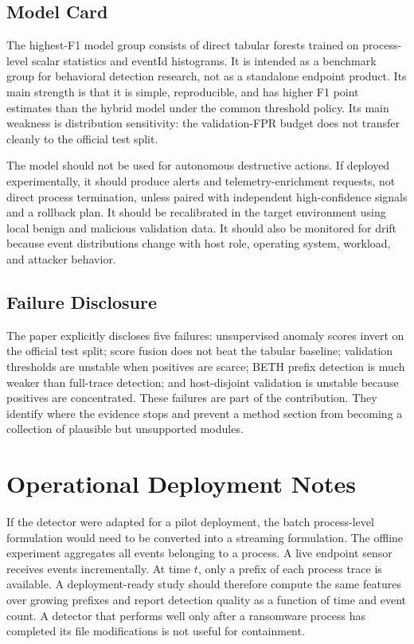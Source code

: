 \documentclass[journal]{IEEEtran}
\begin{document}
\subsection{Model Card}

The highest-F1 model group consists of direct tabular forests trained on process-level scalar statistics and eventId histograms. It is intended as a benchmark group for behavioral detection research, not as a standalone endpoint product. Its main strength is that it is simple, reproducible, and has higher F1 point estimates than the hybrid model under the common threshold policy. Its main weakness is distribution sensitivity: the validation-FPR budget does not transfer cleanly to the official test split.

The model should not be used for autonomous destructive actions. If deployed experimentally, it should produce alerts and telemetry-enrichment requests, not direct process termination, unless paired with independent high-confidence signals and a rollback plan. It should be recalibrated in the target environment using local benign and malicious validation data. It should also be monitored for drift because event distributions change with host role, operating system, workload, and attacker behavior.

\subsection{Failure Disclosure}

The paper explicitly discloses five failures: unsupervised anomaly scores invert on the official test split; score fusion does not beat the tabular baseline; validation thresholds are unstable when positives are scarce; BETH prefix detection is much weaker than full-trace detection; and host-disjoint validation is unstable because positives are concentrated. These failures are part of the contribution. They identify where the evidence stops and prevent a method section from becoming a collection of plausible but unsupported modules.

\section{Operational Deployment Notes}
\label{app:deployment}

If the detector were adapted for a pilot deployment, the batch process-level formulation would need to be converted into a streaming formulation. The offline experiment aggregates all events belonging to a process. A live endpoint sensor receives events incrementally. At time $t$, only a prefix of each process trace is available. A deployment-ready study should therefore compute the same features over growing prefixes and report detection quality as a function of time and event count. A detector that performs well only after a ransomware process has completed its file modifications is not useful for containment.
\end{document}
